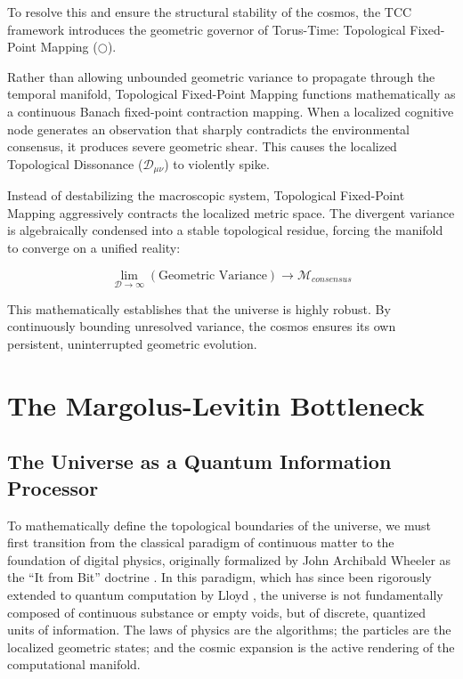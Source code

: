\documentclass[12pt,openany]{book}
\theoremstyle{plain}
\theoremstyle{definition}
\theoremstyle{remark}
\begin{document}
To resolve this and ensure the structural stability of the cosmos, the TCC framework introduces the geometric governor of Torus-Time: Topological Fixed-Point Mapping ($\bigcirc$).

Rather than allowing unbounded geometric variance to propagate through the temporal manifold, Topological Fixed-Point Mapping functions mathematically as a continuous Banach fixed-point contraction mapping. When a localized cognitive node generates an observation that sharply contradicts the environmental consensus, it produces severe geometric shear. This causes the localized Topological Dissonance ($\mathcal{D}_{\mu\nu}$) to violently spike.

Instead of destabilizing the macroscopic system, Topological Fixed-Point Mapping aggressively contracts the localized metric space. The divergent variance is algebraically condensed into a stable topological residue, forcing the manifold to converge on a unified reality:

$$\lim_{\mathcal{D} \to \infty} (\text{Geometric Variance}) \to \mathcal{M}_{consensus}$$

This mathematically establishes that the universe is highly robust. By continuously bounding unresolved variance, the cosmos ensures its own persistent, uninterrupted geometric evolution.

\chapter{The Margolus-Levitin Bottleneck}

\section{The Universe as a Quantum Information Processor}

To mathematically define the topological boundaries of the universe, we must first transition from the classical paradigm of continuous matter to the foundation of digital physics, originally formalized by John Archibald Wheeler as the ``It from Bit'' doctrine \cite{wheeler1990}. In this paradigm, which has since been rigorously extended to quantum computation by Lloyd \cite{lloyd2006}, the universe is not fundamentally composed of continuous substance or empty voids, but of discrete, quantized units of information. The laws of physics are the algorithms; the particles are the localized geometric states; and the cosmic expansion is the active rendering of the computational manifold.
\end{document}
